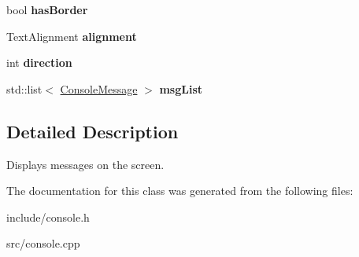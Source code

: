 \begin{DoxyCompactItemize}
\item 
\hypertarget{classConsole_ae927aac3e63f911d134aa707264e8dc1}{
bool {\bfseries has\-Border}}
\label{d2/d24/classConsole_ae927aac3e63f911d134aa707264e8dc1}

\item 
\hypertarget{classConsole_ac96d0427972c9cdcb1ea9be8b4acfe84}{
\-Text\-Alignment {\bfseries alignment}}
\label{d2/d24/classConsole_ac96d0427972c9cdcb1ea9be8b4acfe84}

\item 
\hypertarget{classConsole_a56fc08c91cedd091c4c1f19d8e4dbcfc}{
int {\bfseries direction}}
\label{d2/d24/classConsole_a56fc08c91cedd091c4c1f19d8e4dbcfc}

\item 
\hypertarget{classConsole_aa005de6cc3507e9c76fb3a5d14efa561}{
std\-::list$<$ \hyperlink{structConsoleMessage}{\-Console\-Message} $>$ {\bfseries msg\-List}}
\label{d2/d24/classConsole_aa005de6cc3507e9c76fb3a5d14efa561}

\end{DoxyCompactItemize}


\subsection{\-Detailed \-Description}
\-Displays messages on the screen. 

\-The documentation for this class was generated from the following files\-:\begin{DoxyCompactItemize}
\item 
include/console.\-h\item 
src/console.\-cpp\end{DoxyCompactItemize}
